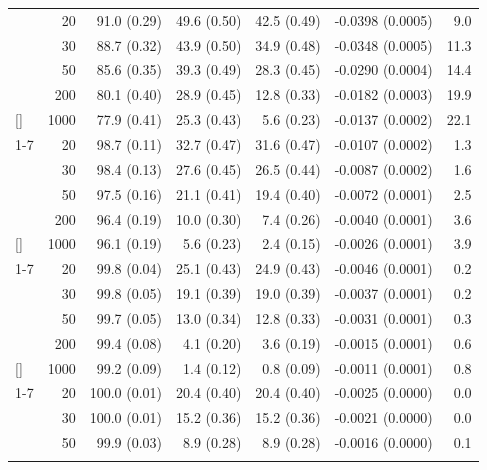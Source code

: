 \documentclass[
  nonatbib,
  authoryear,
  preprint]{elsarticle}
\begin{document}
\begin{longtable}[t]{lrrrrrr}
\endfoot
\bottomrule
\endlastfoot
 & 20 & 91.0 (0.29) & 49.6 (0.50) & 42.5 (0.49) & -0.0398 (0.0005) & 9.0\\
\nopagebreak
 & 30 & 88.7 (0.32) & 43.9 (0.50) & 34.9 (0.48) & -0.0348 (0.0005) & 11.3\\
\nopagebreak
 & 50 & 85.6 (0.35) & 39.3 (0.49) & 28.3 (0.45) & -0.0290 (0.0004) & 14.4\\
\nopagebreak
 & 200 & 80.1 (0.40) & 28.9 (0.45) & 12.8 (0.33) & -0.0182 (0.0003) & 19.9\\
\nopagebreak
\multirow[t]{-4}{*}[\normalbaselineskip]{\raggedright\arraybackslash 5} & 1000 & 77.9 (0.41) & 25.3 (0.43) & 5.6 (0.23) & -0.0137 (0.0002) & 22.1\\
\cmidrule{1-7}\pagebreak[0]
 & 20 & 98.7 (0.11) & 32.7 (0.47) & 31.6 (0.47) & -0.0107 (0.0002) & 1.3\\
\nopagebreak
 & 30 & 98.4 (0.13) & 27.6 (0.45) & 26.5 (0.44) & -0.0087 (0.0002) & 1.6\\
\nopagebreak
 & 50 & 97.5 (0.16) & 21.1 (0.41) & 19.4 (0.40) & -0.0072 (0.0001) & 2.5\\
\nopagebreak
 & 200 & 96.4 (0.19) & 10.0 (0.30) & 7.4 (0.26) & -0.0040 (0.0001) & 3.6\\
\nopagebreak
\multirow[t]{-4}{*}[\normalbaselineskip]{\raggedright\arraybackslash 10} & 1000 & 96.1 (0.19) & 5.6 (0.23) & 2.4 (0.15) & -0.0026 (0.0001) & 3.9\\
\cmidrule{1-7}\pagebreak[0]
 & 20 & 99.8 (0.04) & 25.1 (0.43) & 24.9 (0.43) & -0.0046 (0.0001) & 0.2\\
\nopagebreak
 & 30 & 99.8 (0.05) & 19.1 (0.39) & 19.0 (0.39) & -0.0037 (0.0001) & 0.2\\
\nopagebreak
 & 50 & 99.7 (0.05) & 13.0 (0.34) & 12.8 (0.33) & -0.0031 (0.0001) & 0.3\\
\nopagebreak
 & 200 & 99.4 (0.08) & 4.1 (0.20) & 3.6 (0.19) & -0.0015 (0.0001) & 0.6\\
\nopagebreak
\multirow[t]{-4}{*}[\normalbaselineskip]{\raggedright\arraybackslash 15} & 1000 & 99.2 (0.09) & 1.4 (0.12) & 0.8 (0.09) & -0.0011 (0.0001) & 0.8\\
\cmidrule{1-7}\pagebreak[0]
 & 20 & 100.0 (0.01) & 20.4 (0.40) & 20.4 (0.40) & -0.0025 (0.0000) & 0.0\\
\nopagebreak
 & 30 & 100.0 (0.01) & 15.2 (0.36) & 15.2 (0.36) & -0.0021 (0.0000) & 0.0\\
\nopagebreak
 & 50 & 99.9 (0.03) & 8.9 (0.28) & 8.9 (0.28) & -0.0016 (0.0000) & 0.1\\
\nopagebreak

\end{longtable}
\end{document}
